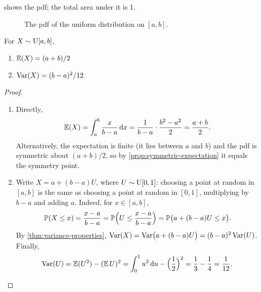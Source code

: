  shows the pdf; the total area under it is 1.

\begin{figure}[H]
\centering
{}
\caption{The pdf of the uniform distribution on $[a, b]$.}
\label{fig:uniform-pdf}
\end{figure}


\begin{theorem}\label{thm:uniform-properties}
For $X \sim \mathrm{U}[a, b]$,
\begin{enumerate}
  \item $\operatorname{\mathbb{E}}(X) = (a + b)/2$
  \item $\operatorname{Var}(X) = (b - a)^2/12$
\end{enumerate}
\end{theorem}

\begin{proof}\leavevmode
\begin{enumerate}[leftmargin=*]
  \item[1.] Directly,
\[
  \operatorname{\mathbb{E}}(X) = \int_a^b \frac{x}{b - a} \mathop{}\!\mathrm{d} x = \frac{1}{b-a} \cdot \frac{b^2 - a^2}{2} = \frac{a + b}{2}.
\]
Alternatively, the expectation is finite (it lies between $a$ and $b$) and the pdf is symmetric about $(a+b)/2$, so by \cref{prop:symmetric-expectation} it equals the symmetry point.
  \item[2.] Write $X = a + (b - a)U$, where $U \sim \mathrm{U}[0, 1]$: choosing a point at random in $[a, b]$ is the same as choosing a point at random in $[0, 1]$, multiplying by $b - a$ and adding $a$. Indeed, for $x \in [a, b]$,
\[
  \mathbb{P}(X \le x) = \frac{x - a}{b - a} = \mathbb{P}\Bigl(U \le \frac{x - a}{b - a}\Bigr) = \mathbb{P}\bigl(a + (b-a)U \le x\bigr).
\]
By \cref{thm:variance-properties}, $\operatorname{Var}(X) = \operatorname{Var}\bigl(a + (b-a)U\bigr) = (b-a)^2 \operatorname{Var}(U)$. Finally,
\[
  \operatorname{Var}(U) = \operatorname{\mathbb{E}}(U^2) - (\operatorname{\mathbb{E}} U)^2 = \int_0^1 u^2 \mathop{}\!\mathrm{d} u - \Bigl(\frac12\Bigr)^2 = \frac13 - \frac14 = \frac{1}{12}. \qedhere
  \]
\end{enumerate}
\end{proof}

